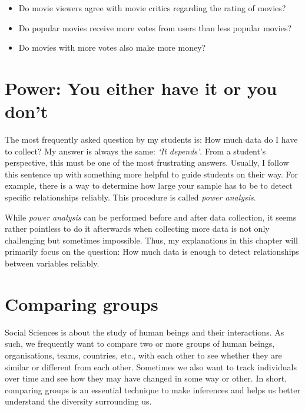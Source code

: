 \documentclass[
  letterpaper,
]{krantz}
\begin{document}
\begin{itemize}
\item
  Do movie viewers agree with movie critics regarding the rating of
  movies?
\item
  Do popular movies receive more votes from users than less popular
  movies?
\item
  Do movies with more votes also make more money?
\end{itemize}


\chapter{Power: You either have it or you don't}\label{power-analysis}

The most frequently asked question by my students is: How much data do I
have to collect? My answer is always the same: \emph{`It depends'}. From
a student's perspective, this must be one of the most frustrating
answers. Usually, I follow this sentence up with something more helpful
to guide students on their way. For example, there is a way to determine
how large your sample has to be to detect specific relationships
reliably. This procedure is called \emph{power analysis}.

While \emph{power analysis} can be performed before and after data
collection, it seems rather pointless to do it afterwards when
collecting more data is not only challenging but sometimes impossible.
Thus, my explanations in this chapter will primarily focus on the
question: How much data is enough to detect relationships between
variables reliably.


\chapter{Comparing groups}\label{comparing-groups}

Social Sciences is about the study of human beings and their
interactions. As such, we frequently want to compare two or more groups
of human beings, organisations, teams, countries, etc., with each other
to see whether they are similar or different from each other. Sometimes
we also want to track individuals over time and see how they may have
changed in some way or other. In short, comparing groups is an essential
technique to make inferences and helps us better understand the
diversity surrounding us.
\end{document}
